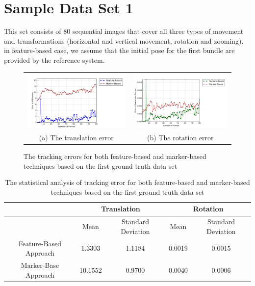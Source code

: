\section{Sample Data Set 1} \label{sec:sample_01}
This set consists of 80 sequential images that cover all three types of movement and transformations (horizontal and vertical movement, rotation and zooming). in feature-based case, we assume that the initial pose for the first bundle are provided by the reference system.

\begin{figure}[H]
\begin{tabular}{cc}
  \includegraphics[width=80mm]{figures/global_35/graph_translation} &  \includegraphics[width=80mm]{figures/global_35/graph_rotation} \\
(a) The translation error & (b) The rotation error \\[6pt]
\end{tabular}
\caption{The tracking errors for both feature-based and marker-based techniques based on the first ground truth data set}   \label{fig:sample_01}
\end{figure}

\begin{table}[H]
\centering
  \begin{tabular}{| c || c | c | c | c |}
      \hline
       & \multicolumn{2}{c|}{Translation} & \multicolumn{2}{c|}{Rotation} \\ \hline
       & Mean & Standard Deviation & Mean & Standard Deviation \\ \hline
      Feature-Based Approach & 1.3303 & 1.1184 & 0.0019 & 0.0015 \\ \hline
      Marker-Base Approach & 10.1552 & 0.9700 & 0.0040 & 0.0006 \\ \hline
  \end{tabular}
  \caption{The statistical analysis of tracking error for both feature-based and marker-based techniques based on the first ground truth data set} \label{tab:sample_01}
\end{table}

